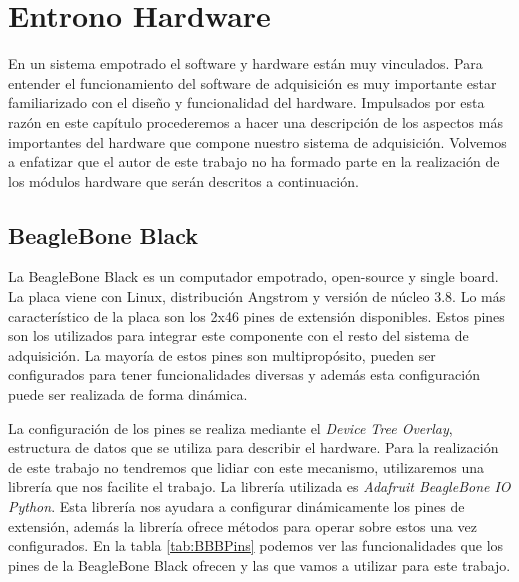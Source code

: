 \chapter{Entrono Hardware}
\label{entornoHW}

En un sistema empotrado el software y hardware están muy vinculados. Para entender el funcionamiento del software de adquisición es muy importante estar
familiarizado con el diseño y funcionalidad del hardware. Impulsados por esta razón en este capítulo procederemos a hacer una descripción de
los aspectos más importantes del hardware que compone nuestro sistema de adquisición. Volvemos a enfatizar que el autor de este trabajo no
ha formado parte  en la realización de los módulos hardware que serán descritos a continuación.
\section{BeagleBone Black}
	La BeagleBone Black\cite{Beagle} es un computador empotrado, open-source y single board. La placa viene con Linux, distribución Angstrom y versión
	de núcleo 3.8. Lo más característico de la placa son los 2x46 pines de extensión disponibles. Estos pines son los utilizados para
	integrar este componente con el resto del sistema de adquisición. La mayoría de estos pines son multipropósito, pueden ser
	configurados para tener funcionalidades diversas y además esta configuración puede ser realizada de forma dinámica\cite{BeagleWiki}.
	\par
	La configuración de los pines se realiza mediante el \emph{Device Tree Overlay}, estructura de datos que se utiliza para describir el
	hardware. Para la realización de este trabajo no tendremos que lidiar con este mecanismo, utilizaremos una librería que nos facilite
	el trabajo. La librería utilizada es \emph{Adafruit BeagleBone IO Python}\cite{AdaFruitGit}. Esta librería nos ayudara a configurar dinámicamente los pines
	de extensión, además la librería ofrece métodos para operar sobre estos una vez configurados. En la tabla \ref{tab:BBBPins} podemos
	ver las funcionalidades que los pines de la BeagleBone Black ofrecen y las que vamos a utilizar para este trabajo.
